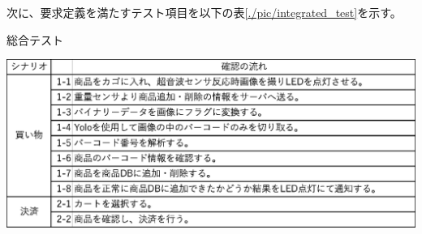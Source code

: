 次に、要求定義を満たすテスト項目を以下の表\ref{./pic/integrated_test}を示す。

\begin{table}[htbp]
\centering
\caption{総合テスト}
\includegraphics[width=15cm]{./pic/integrated_test.eps}
\label{integrated_test}
\end{table}